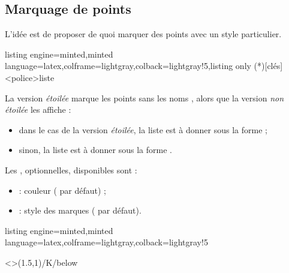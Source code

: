 \documentclass[11pt,a4paper]{ltxdoc}
\begin{document}
\pagebreak

\subsection{Marquage de points}\label{markpts}

L'idée est de proposer de quoi marquer des points avec un style particulier.

\begin{tcblisting}{listing engine=minted,minted language=latex,colframe=lightgray,colback=lightgray!5,listing only}
\MarquerPts(*)[clés]<police>{liste}
\end{tcblisting}

La version \textit{étoilée} marque les points sans les \og noms \fg, alors que la version \textit{non étoilée} les affiche :

\begin{itemize}
	\item dans le cas de la version \textit{étoilée}, la liste est à donner sous la forme  ;
	\item sinon, la liste est à donner sous la forme .
\end{itemize}

\smallskip

Les \MontreCode{[clés]}, optionnelles, disponibles sont :

\smallskip

\begin{itemize}
	\item {} : couleur ( par défaut) ;
	\item {} : style des marques ( par défaut).
\end{itemize}

\begin{tcblisting}{listing engine=minted,minted language=latex,colframe=lightgray,colback=lightgray!5}
\begin{GraphiqueTikz}[x=1.5cm,y=1.5cm,Ymin=-2]
	\MarquerPts[Couleur=orange,Style=+]<\small\sffamily>{(1.5,1)/K/below} %
\end{GraphiqueTikz}
\end{tcblisting}
\end{document}

